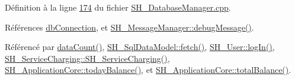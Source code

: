 Définition à la ligne \hyperlink{SH__DatabaseManager_8cpp_source_l00174}{174} du fichier \hyperlink{SH__DatabaseManager_8cpp_source}{S\-H\-\_\-\-Database\-Manager.\-cpp}.



Références \hyperlink{classSH__DatabaseManager_a9291f61c3abbba2c4f1567b1d8325f0e}{db\-Connection}, et \hyperlink{classSH__MessageManager_a379f2aa0a590a5add34dbe91f98b2ff7}{S\-H\-\_\-\-Message\-Manager\-::debug\-Message()}.



Référencé par \hyperlink{classSH__DatabaseManager_ad3e372d89b60b43e3f3bae649be6d7fb}{data\-Count()}, \hyperlink{classSH__SqlDataModel_ab6c206088250a66ddc8cb8d33a38e421}{S\-H\-\_\-\-Sql\-Data\-Model\-::fetch()}, \hyperlink{classSH__User_a98e3e3ca706a6988e6d7af23ce8bb82a}{S\-H\-\_\-\-User\-::log\-In()}, \hyperlink{classSH__ServiceCharging_afa5273d046049b1c2b020a6a19a8290b}{S\-H\-\_\-\-Service\-Charging\-::\-S\-H\-\_\-\-Service\-Charging()}, \hyperlink{classSH__ApplicationCore_ac6ebc8bb079a1faf430129bf7922b65d}{S\-H\-\_\-\-Application\-Core\-::today\-Balance()}, et \hyperlink{classSH__ApplicationCore_a7c97dd4990e8f4b24afda9e7c5b88c21}{S\-H\-\_\-\-Application\-Core\-::total\-Balance()}.


